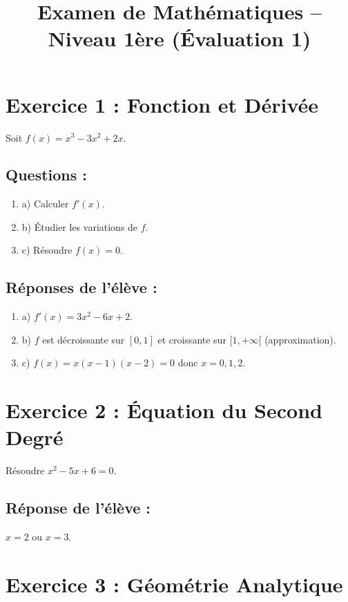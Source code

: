 \documentclass{article}
\begin{document}
\title{Examen de Mathématiques – Niveau 1ère (Évaluation 1)}
\maketitle

\section*{Exercice 1 : Fonction et Dérivée}

Soit $f(x) = x^3 - 3x^2 + 2x$. 

\subsection*{Questions :}
\begin{enumerate}
    \item a) Calculer $f'(x)$.
    \item b) Étudier les variations de $f$.
    \item c) Résoudre $f(x) = 0$.
\end{enumerate}

\subsection*{Réponses de l’élève :}
\begin{enumerate}
    \item a) $f'(x) = 3x^2 - 6x + 2$.
    \item b) $f$ est décroissante sur $[0, 1]$ et croissante sur $[1, +\infty[$ (approximation).
    \item c) $f(x) = x(x - 1)(x - 2) = 0$ donc $x = 0, 1, 2$.
\end{enumerate}

\section*{Exercice 2 : Équation du Second Degré}

Résoudre $x^2 - 5x + 6 = 0$. 

\subsection*{Réponse de l’élève :}
$x = 2$ ou $x = 3$.

\section*{Exercice 3 : Géométrie Analytique}
\end{document}
